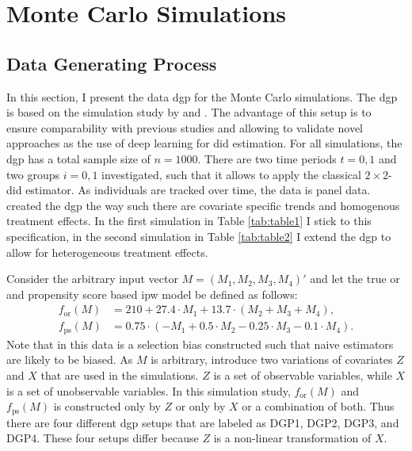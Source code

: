\section{Monte Carlo Simulations}


\subsection{Data Generating Process}

In this section, I present the data \ac{dgp} for the Monte Carlo simulations.
The \ac{dgp} is based on the simulation study by \citet{kang2007demystifying} and \citet{santannaDoublyRobustDifferenceindifferences2020}.
The advantage of this setup is to ensure comparability with previous studies and allowing to validate novel approaches as the use of deep learning for \ac{did} estimation.
For all simulations, the \ac{dgp} has a total sample size of $n=1000$.
There are two time periods $t=0,1$ and two groups $i=0,1$ investigated, such that it allows to apply the classical $2\times2$-\ac{did} estimator.
As individuals are tracked over time, the data is panel data.
\citet{kang2007demystifying} created the \ac{dgp} the way such there are covariate specific trends and homogenous treatment effects.
In the first simulation in Table \ref{tab:table1} I stick to this specification, in the second simulation in Table \ref{tab:table2} I extend the \ac{dgp} to allow for heterogeneous treatment effects.

Consider the arbitrary input vector $M = (M_1, M_2, M_3, M_4)'$ and let the true \ac{or} and propensity score based \ac{ipw} model be defined as follows:
\begin{align}
    f_{\text{or}}(M) &= 210 + 27.4 \cdot M_1 + 13.7 \cdot (M_2 + M_3 + M_4), \\
    f_{\text{ps}}(M) &= 0.75 \cdot (-M_1 + 0.5 \cdot M_2 - 0.25 \cdot M_3 - 0.1 \cdot M_4).
\end{align}
Note that in this data is a selection bias constructed \citep{kang2007demystifying} such that naive estimators are likely to be biased.
As $M$ is arbitrary, \citet{kang2007demystifying} introduce two variations of covariates $Z$ and $X$ that are used in the simulations.
$Z$ is a set of observable variables, while $X$ is a set of unobservable variables.
In this simulation study, $f_{\text{or}}(M)$ and $f_{\text{ps}}(M)$ is constructed only by $Z$ or only by $X$ or a combination of both.
Thus there are four different \ac{dgp} setups that are labeled as DGP1, DGP2, DGP3, and DGP4.
These four setups differ because $Z$ is a non-linear transformation of $X$.

